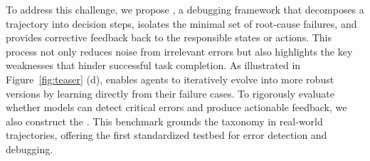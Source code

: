 
To address this challenge, we propose \ModelName{}, a debugging framework that decomposes a trajectory into decision steps, isolates the minimal set of root-cause failures, and provides corrective feedback back to the responsible states or actions. This process not only reduces noise from irrelevant errors but also highlights the key weaknesses that hinder successful task completion. As illustrated in Figure~\ref{fig:teaser} (d), \ModelName{} enables agents to iteratively evolve into more robust versions by learning directly from their failure cases. To rigorously evaluate whether models can detect critical errors and produce actionable feedback, we also construct the \Bench{}. This benchmark grounds the taxonomy in real-world trajectories, offering the first standardized testbed for error detection and debugging.

